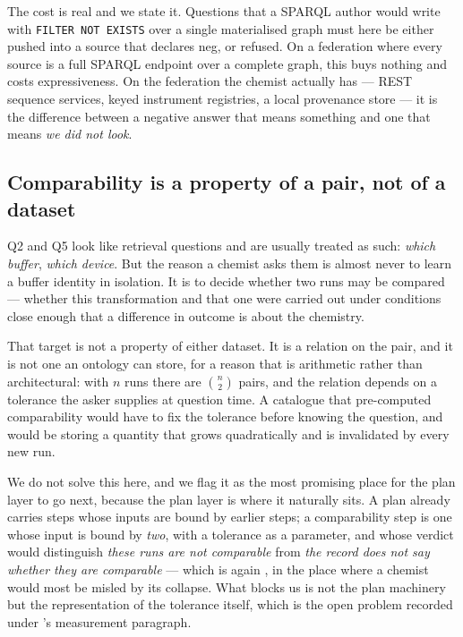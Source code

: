 \documentclass[11pt,a4paper]{article}
\theoremstyle{plain}
\theoremstyle{definition}
\theoremstyle{remark}
\begin{document}
The cost is real and we state it. Questions that a SPARQL author would
write with \texttt{FILTER NOT EXISTS} over a single materialised graph
must here be either pushed into a source that declares \textsf{neg}, or
refused. On a federation where every source is a full SPARQL endpoint
over a complete graph, this buys nothing and costs expressiveness. On
the federation the chemist actually has --- REST sequence services,
keyed instrument registries, a local provenance store --- it is the
difference between a negative answer that means something and one that
means \emph{we did not look}.

\subsection{Comparability is a property of a pair, not of a dataset}
\label{sec:pairs}

Q2 and Q5 look like retrieval questions and are usually treated as such:
\emph{which buffer}, \emph{which device}. But the reason a chemist asks
them is almost never to learn a buffer identity in isolation. It is to
decide whether two runs may be compared --- whether this transformation
and that one were carried out under conditions close enough that a
difference in outcome is about the chemistry.

That target is not a property of either dataset. It is a relation on the
pair, and it is not one an ontology can store, for a reason that is
arithmetic rather than architectural: with $n$ runs there are
$\binom{n}{2}$ pairs, and the relation depends on a tolerance the asker
supplies at question time. A catalogue that pre-computed comparability
would have to fix the tolerance before knowing the question, and would
be storing a quantity that grows quadratically and is invalidated by
every new run.

We do not solve this here, and we flag it as the most promising place
for the plan layer to go next, because the plan layer is where it
naturally sits. A plan already carries steps whose inputs are bound by
earlier steps; a comparability step is one whose input is bound by
\emph{two}, with a tolerance as a parameter, and whose verdict would
distinguish \emph{these runs are not comparable} from \emph{the record
does not say whether they are comparable} --- which is again
, in the place where a chemist would most be misled by
its collapse. What blocks us is not the plan machinery but the
representation of the tolerance itself, which is the open problem
recorded under 's measurement paragraph.
\end{document}
